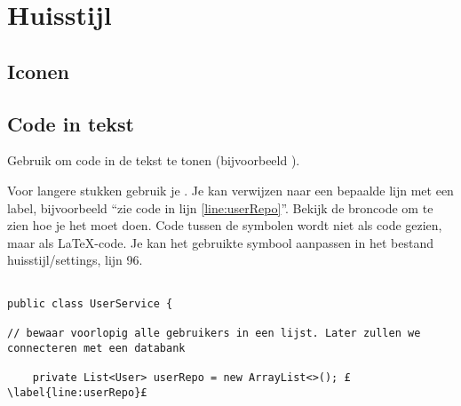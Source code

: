 
\chapter{Huisstijl}
\section{Iconen}


\section{Code in tekst}
Gebruik  om code in de tekst te tonen  (bijvoorbeeld ).

Voor langere stukken gebruik je . Je kan verwijzen naar een bepaalde lijn met een label, bijvoorbeeld ``zie code in lijn \ref{line:userRepo}''.  Bekijk de broncode om te zien hoe je het moet doen. Code tussen de symbolen  wordt niet als code gezien, maar als \LaTeX-code. Je kan het gebruikte symbool aanpassen in het bestand huisstijl/settings, lijn 96.
\begin{lstlisting}[caption={My label}, label={lst:label}]

public class UserService { 

// bewaar voorlopig alle gebruikers in een lijst. Later zullen we connecteren met een databank 

    private List<User> userRepo = new ArrayList<>(); £\label{line:userRepo}£
 \end{lstlisting}



